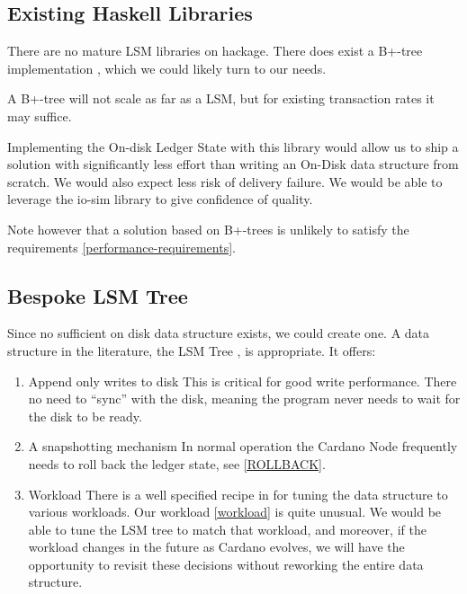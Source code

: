 \documentclass[11pt,a4paper]{article}
\begin{document}
\subsection{Existing Haskell Libraries}

There are no mature LSM libraries on hackage. There does exist a B+-tree
implementation ,
which we could likely turn to our needs.

A B+-tree will not scale as far as a LSM, but for existing transaction rates it
may suffice.

Implementing the On-disk Ledger State with this library would allow us to ship a
solution with significantly less effort than writing an On-Disk data structure
from scratch. We would also expect less risk of delivery failure. We would be
able to leverage the io-sim library to give confidence of quality.

Note however that a solution based on B+-trees is unlikely to satisfy the
requirements \ref{performance-requirements}.

\subsection{Bespoke LSM Tree}

Since no sufficient on disk data structure exists, we could create one. A data
structure in the literature, the LSM Tree \cite{monkey}, is appropriate. It offers:

\begin{enumerate}
  \item Append only writes to disk
        This is critical for good write performance. There no need to ``sync''
        with the disk, meaning the program never needs to wait for the disk to be ready.
  \item A snapshotting mechanism
        In normal operation the Cardano Node frequently needs to roll back the
        ledger state, see \ref{ROLLBACK}.
  \item Workload
        There is a  well specified recipe in \cite{monkey} for tuning  the data
        structure to various workloads. Our workload \ref{workload} is quite unusual. We
        would be able to tune the LSM tree to match that workload, and moreover, if the
        workload changes in the future as Cardano evolves, we will have the opportunity
        to revisit these decisions without reworking the entire data structure.
\end{enumerate}
\end{document}
